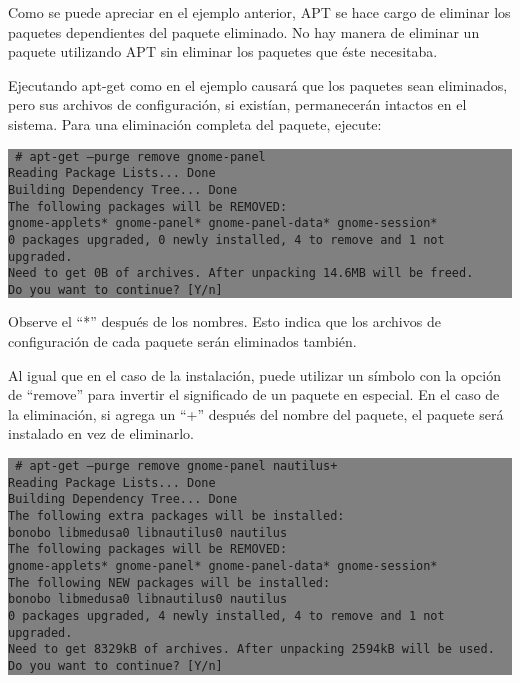 \documentclass[12pt]{article}
\begin{document}
Como se puede apreciar en el ejemplo anterior, APT se hace cargo de eliminar los paquetes dependientes del paquete eliminado. No hay manera de eliminar un paquete utilizando APT sin eliminar los paquetes que éste necesitaba.

Ejecutando apt-get como en el ejemplo causará que los paquetes sean eliminados, pero sus archivos de configuración, si existían, permanecerán intactos en el sistema. Para una eliminación completa del paquete, ejecute:

\colorbox{grey}{\parbox[t]{0.95\linewidth}{ \vspace*{0.5cm} {\tt
     \# apt-get --purge remove gnome-panel\\
     Reading Package Lists... Done\\
     Building Dependency Tree... Done\\
     The following packages will be REMOVED:\\
       gnome-applets* gnome-panel* gnome-panel-data* gnome-session*\\
     0 packages upgraded, 0 newly installed, 4 to remove and 1 not upgraded.\\
     Need to get 0B of archives. After unpacking 14.6MB will be freed.\\
     Do you want to continue? [Y/n]\\
 } \vspace*{0.5cm} } } 

Observe el ``*'' después de los nombres. Esto indica que los archivos de configuración de cada paquete serán eliminados también.

Al igual que en el caso de la instalación, puede utilizar un símbolo con la opción de ``remove'' para invertir el significado de un paquete en especial. En el caso de la eliminación, si agrega un ``+'' después del nombre del paquete, el paquete será instalado en vez de eliminarlo.

\colorbox{grey}{\parbox[t]{0.95\linewidth}{ \vspace*{0.5cm} {\tt
     \# apt-get --purge remove gnome-panel nautilus+\\
     Reading Package Lists... Done\\
     Building Dependency Tree... Done\\
     The following extra packages will be installed:\\
       bonobo libmedusa0 libnautilus0 nautilus\\
     The following packages will be REMOVED:\\
       gnome-applets* gnome-panel* gnome-panel-data* gnome-session*\\
     The following NEW packages will be installed:\\
       bonobo libmedusa0 libnautilus0 nautilus\\
     0 packages upgraded, 4 newly installed, 4 to remove and 1 not upgraded.\\
     Need to get 8329kB of archives. After unpacking 2594kB will be used.\\
     Do you want to continue? [Y/n]\\
 } \vspace*{0.5cm} } } 
\end{document}
